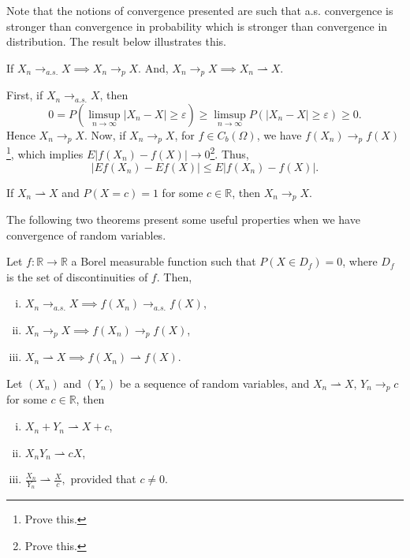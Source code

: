 Note that the notions of convergence presented are such
that a.s. convergence is stronger than convergence in probability
which is stronger than convergence in distribution. The result
below illustrates this.

\begin{theorem}
	If $X_n \to_{a.s.} X \implies X_n \to_p X$. And,
	$X_n \to_p X \implies X_n \rightharpoonup X$.
\end{theorem}
\begin{prf}
	First, if $X_n \to_{a.s.} X$, then
	\begin{equation*}
		0 = P(\limsup_{n\to \infty} |X_n - X| \geq \varepsilon) \geq
		\limsup_{n\to \infty}P(|X_n - X| \geq \varepsilon)\geq 0.
	\end{equation*}
	Hence $X_n \to_p X$. Now, if $X_n \to_p X$, for $f \in C_b(\Omega)$,
	we have $f(X_n) \to_p f(X)$\footnote{Prove this.}, which
	implies $E|f(X_n) - f(X)| \to 0$\footnote{Prove this.}. Thus,
	\begin{equation*}
		|E f(X_n) - E f(X)| \leq E|f(X_n) - f(X)|.
	\end{equation*}
\end{prf}

\begin{proposition}
	If $X_n \rightharpoonup X$ and $P(X = c) = 1$ for some
	$c \in \mathbb R$, then $X_n \to_p X$.
\end{proposition}

The following two theorems present some useful properties when we have convergence
of random variables.
\begin{theorem}
	Let $f: \mathbb R \to \mathbb R$ a Borel
	measurable function such that $P(X\in D_f)=0$, where $D_f$ is the
	set of discontinuities of $f$. Then,
	\begin{enumerate}[(i)]
		\item $X_n \to_{a.s.} X \implies f(X_n) \to_{a.s.} f(X)$,
		\item $X_n \to_{p} X \implies f(X_n) \to_{p} f(X)$,
		\item $X_n \rightharpoonup X \implies f(X_n) \rightharpoonup f(X)$.
	\end{enumerate}
\end{theorem}

\begin{theorem}
	Let $(X_n)$ and $(Y_n)$ be a sequence of random variables, and
	$X_n \rightharpoonup X$, $Y_n \to_p c$ for some $c \in \mathbb R$, then
	\begin{enumerate}[(i)]
		\item $X_n + Y_n \rightharpoonup X+c$,
		\item $X_n Y_n \rightharpoonup cX$,
		\item $\frac{X_n}{Y_n} \rightharpoonup \frac{X}{c},$ provided that $c \neq 0$.
	\end{enumerate}
\end{theorem}

